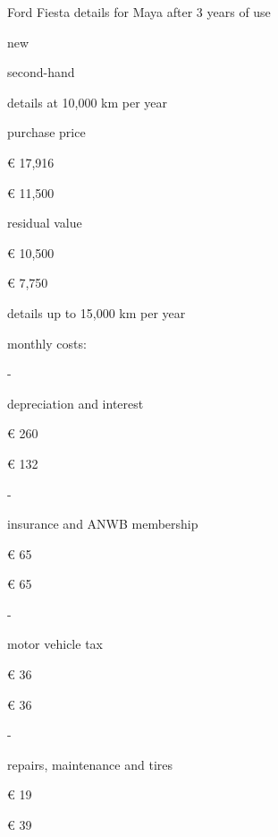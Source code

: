 \begin{longtable}[t]
Ford Fiesta details for Maya after 3 years of use





new


second-hand





details at 10,000 km per year





purchase price


€ 17,916


€ 11,500





residual value


€ 10,500


€ 7,750








details up to 15,000 km per year








monthly costs:








-


depreciation and interest


€ 260


€ 132





-


insurance and ANWB membership


€ 65


€ 65





-


motor vehicle tax


€ 36


€ 36





-


repairs, maintenance and tires


€ 19


€ 39












\end{longtable}
